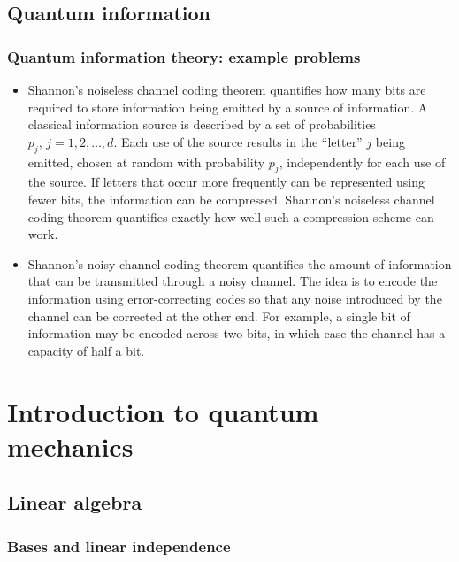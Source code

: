 \documentclass{article}
\begin{document}
\subsection{Quantum information}

\subsubsection{Quantum information theory: example problems}

\begin{itemize}
  \item Shannon's noiseless channel coding theorem quantifies how many bits are required to store information being emitted by a source of information. A classical information source is described by a set of probabilities $p_j, \,j = 1, 2, \ldots, d$. Each use of the source results in the ``letter'' $j$ being emitted, chosen at random with probability $p_j$, independently for each use of the source. If letters that occur more frequently can be represented using fewer bits, the information can be compressed. Shannon's noiseless channel coding theorem quantifies exactly how well such a compression scheme can work.

  \item Shannon's noisy channel coding theorem quantifies the amount of information that can be transmitted through a noisy channel. The idea is to encode the information using error-correcting codes so that any noise introduced by the channel can be corrected at the other end. For example, a single bit of information may be encoded across two bits, in which case the channel has a capacity of half a bit.
\end{itemize}

\section{Introduction to quantum mechanics}

\subsection{Linear algebra}

\subsubsection{Bases and linear independence}
\end{document}
